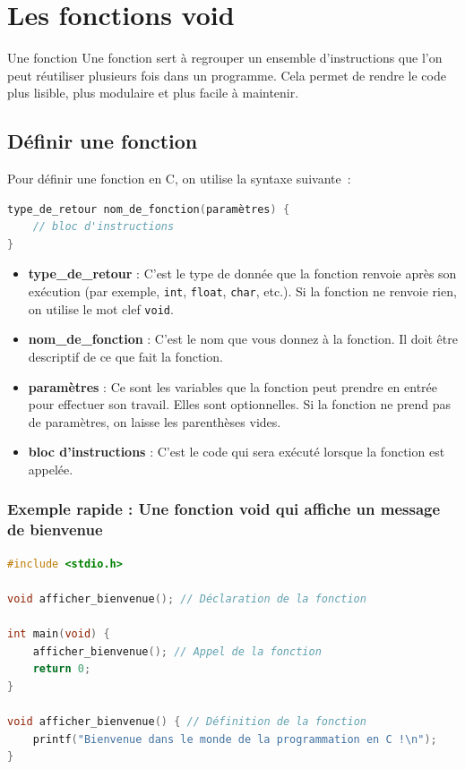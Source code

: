 
\section{Les fonctions void}

\begin{UPSTIinfor}{Une fonction}
	Une fonction sert à regrouper un ensemble d'instructions que l'on peut réutiliser plusieurs fois dans un programme. Cela permet de rendre le code plus lisible, plus modulaire et plus facile à maintenir.
\end{UPSTIinfor}

\subsection{Définir une fonction}
Pour définir une fonction en C, on utilise la syntaxe suivante :

\begin{lstlisting}[language=c]
type_de_retour nom_de_fonction(paramètres) {
    // bloc d'instructions
}
\end{lstlisting}

\begin{itemize}
	\item \textbf{type_de_retour} : C'est le type de donnée que la fonction renvoie après son exécution (par exemple, \texttt{int}, \texttt{float}, \texttt{char}, etc.). Si la fonction ne renvoie rien, on utilise le mot clef \texttt{void}.
	\item \textbf{nom_de_fonction} : C'est le nom que vous donnez à la fonction. Il doit être descriptif de ce que fait la fonction.
	\item \textbf{paramètres} : Ce sont les variables que la fonction peut prendre en entrée pour effectuer son travail. Elles sont optionnelles. Si la fonction ne prend pas de paramètres, on laisse les parenthèses vides.
	\item \textbf{bloc d'instructions} : C'est le code qui sera exécuté lorsque la fonction est appelée.
\end{itemize}

\subsubsection{Exemple rapide : Une fonction void qui affiche un message de bienvenue}

\begin{lstlisting}[language=c]
#include <stdio.h>

void afficher_bienvenue(); // Déclaration de la fonction

int main(void) {
    afficher_bienvenue(); // Appel de la fonction
    return 0;
}

void afficher_bienvenue() { // Définition de la fonction
    printf("Bienvenue dans le monde de la programmation en C !\n");
}
\end{lstlisting}

